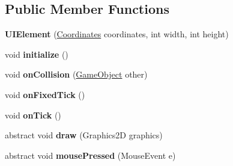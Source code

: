 \subsection*{Public Member Functions}
\begin{DoxyCompactItemize}
\item 
\mbox{\label{classde_1_1me_1_1edgelord_1_1sjgl_1_1ui_1_1_u_i_element_adb0e90e80644f3636d992e7cf3144c5a}} 
{\bfseries U\+I\+Element} (\mbox{\hyperlink{classde_1_1me_1_1edgelord_1_1sjgl_1_1location_1_1_coordinates}{Coordinates}} coordinates, int width, int height)
\item 
\mbox{\label{classde_1_1me_1_1edgelord_1_1sjgl_1_1ui_1_1_u_i_element_a19837c02e0b31b088c70e3256dda23ae}} 
void {\bfseries initialize} ()
\item 
\mbox{\label{classde_1_1me_1_1edgelord_1_1sjgl_1_1ui_1_1_u_i_element_a871cb1bde09bf45420b5c05d19aac01b}} 
void {\bfseries on\+Collision} (\mbox{\hyperlink{classde_1_1me_1_1edgelord_1_1sjgl_1_1gameobject_1_1_game_object}{Game\+Object}} other)
\item 
\mbox{\label{classde_1_1me_1_1edgelord_1_1sjgl_1_1ui_1_1_u_i_element_a5611d6f693fcbae59d63bd5b74923429}} 
void {\bfseries on\+Fixed\+Tick} ()
\item 
\mbox{\label{classde_1_1me_1_1edgelord_1_1sjgl_1_1ui_1_1_u_i_element_ace4ff56bc975ce04a029cabcb62971f4}} 
void {\bfseries on\+Tick} ()
\item 
\mbox{\label{classde_1_1me_1_1edgelord_1_1sjgl_1_1ui_1_1_u_i_element_ab95c48565153af71b5d3783625faba2a}} 
abstract void {\bfseries draw} (Graphics2D graphics)
\item 
\mbox{\label{classde_1_1me_1_1edgelord_1_1sjgl_1_1ui_1_1_u_i_element_a9edd5b578d1294271cd198cb64db2a42}} 
abstract void {\bfseries mouse\+Pressed} (Mouse\+Event e)
\item 

\end{DoxyCompactItemize}
